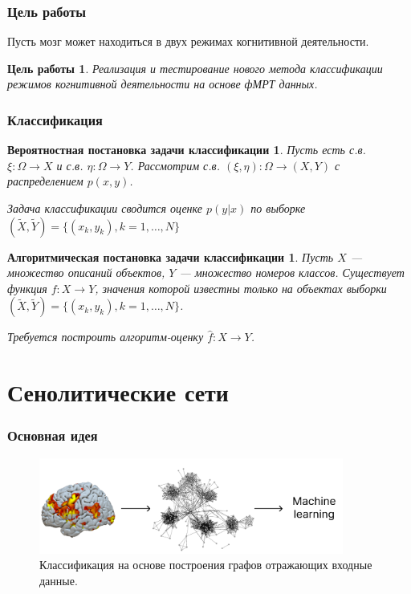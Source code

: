 \documentclass{beamer}
\newtheorem{target_}{Цель работы}
\newtheorem{prob_task}{Вероятностная постановка задачи классификации}
\newtheorem{algo_task}{Алгоритмическая постановка задачи классификации}
\begin{document}
	\begin{frame} 
		\frametitle{Цель работы}
		Пусть мозг может находиться в двух режимах когнитивной деятельности. 
		
		\begin{target_}
			Реализация и тестирование нового метода классификации режимов когнитивной деятельности на основе фМРТ данных.
		\end{target_}			
	\end{frame}

	\begin{frame} 
		\frametitle{Классификация}
		\begin{prob_task}
			Пусть есть с.в. $\xi: \Omega \rightarrow X$ и с.в. $\eta: \Omega \rightarrow Y$. Рассмотрим с.в. $(\xi, \eta): \Omega \rightarrow (X, Y)$ с распределением $p(x, y)$.
			\vspace{0.5cm}
			
			Задача классификации сводится оценке $p(y|x)$ по выборке $(\widetilde{X}, \widetilde{Y}) = \{(x_{k}, y_{k}), k = 1, \dots, N\}$
		\end{prob_task}
	
		\begin{algo_task}
			Пусть $X$ --- множество описаний объектов, $Y$ --- множество номеров классов. Существует функция $f: X \rightarrow Y$, значения которой известны только на объектах выборки $(\widetilde{X}, \widetilde{Y}) =  \{(x_{k}, y_{k}), k = 1, \dots, N\}$. 
			\vspace{0.5cm}
			
			Требуется построить алгоритм-оценку $\widehat{f}: X \rightarrow Y$.
		\end{algo_task}
	\end{frame}
	
	\section{Сенолитические сети}
	\begin{frame} 
		\frametitle{Основная идея}
		\begin{figure}
			\includegraphics[width=10cm]{../images/fmri_graph_ml_1.pdf}
			\caption{Классификация на основе построения графов отражающих входные данные.} 
			\label{fg:3}
		\end{figure}
	\end{frame}
\end{document}
